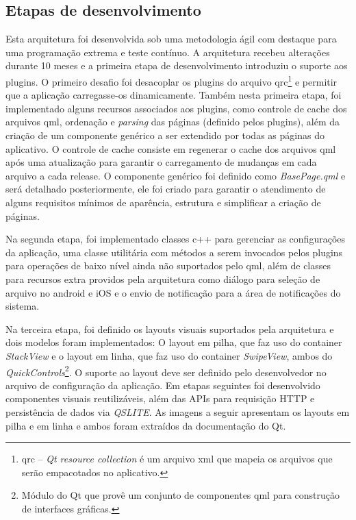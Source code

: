 \subsection{Etapas de desenvolvimento}
Esta arquitetura foi desenvolvida sob uma metodologia ágil com destaque para uma programação extrema e teste contínuo. A arquitetura recebeu alterações durante 10 meses e a primeira etapa de desenvolvimento introduziu o suporte aos plugins. O primeiro desafio foi desacoplar os plugins do arquivo qrc\footnote{qrc – \textit{Qt resource collection} é um arquivo xml que mapeia os arquivos que serão empacotados no aplicativo.} e permitir que a aplicação carregasse-os dinamicamente. Também nesta primeira etapa, foi implementado alguns recursos associados aos plugins, como controle de cache dos arquivos qml, ordenação e \textit{parsing} das páginas (definido pelos plugins), além da criação de um componente genérico a ser extendido por todas as páginas do aplicativo. O controle de cache consiste em regenerar o cache dos arquivos qml após uma atualização para garantir o carregamento de mudanças em cada arquivo a cada release. O componente genérico foi definido como \textit{BasePage.qml} e será detalhado posteriormente, ele foi criado para garantir o atendimento de alguns requisitos mínimos de aparência, estrutura e simplificar a criação de páginas.\par

Na segunda etapa, foi implementado classes c++ para gerenciar as configurações da aplicação, uma classe utilitária com métodos a serem invocados pelos plugins para operações de baixo nível ainda não suportados pelo qml, além de classes para recursos extra providos pela arquitetura como diálogo para seleção de arquivo no android e iOS e o envio de notificação para a área de notificações do sistema.\par

Na terceira etapa, foi definido os layouts visuais suportados pela arquitetura e dois modelos foram implementados: O layout em pilha, que faz uso do container \textit{StackView} e o layout em linha, que faz uso do container \textit{SwipeView}, ambos do \textit{QuickControls}\footnote{Módulo do Qt que provê um conjunto de componentes qml para construção de interfaces gráficas.}. O suporte ao layout deve ser definido pelo desenvolvedor no arquivo de configuração da aplicação. Em etapas seguintes foi desenvolvido componentes visuais reutilizáveis, além das APIs para requisição HTTP e persistência de dados via \textit{QSLITE}. As imagens a seguir apresentam os layouts em pilha e em linha e ambos foram extraídos da documentação do Qt.

